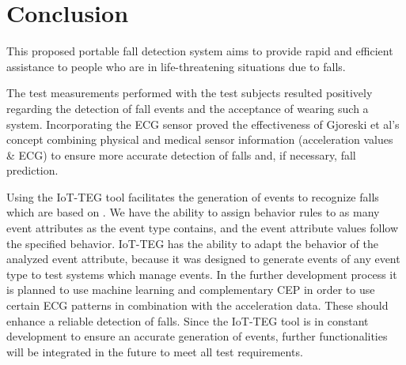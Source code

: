\documentclass[10pt,journal,compsoc]{IEEEtran}
\begin{document}
\section{Conclusion}
\label{sec:conclusion}
%

This proposed portable fall detection system aims to provide rapid and efficient assistance to people who are in life-threatening situations due to falls. 

The test measurements performed with the test subjects resulted positively regarding the detection of fall events and the acceptance of wearing such a system. Incorporating the ECG sensor proved the effectiveness of Gjoreski et al's concept \cite{Gjoreski2014} combining physical and medical sensor information (acceleration values \& ECG) to ensure more accurate detection of falls and, if necessary, fall prediction. 

Using the IoT-TEG tool \cite{Gutierrez2017,TesisGutierrez2017} facilitates the generation of events to recognize falls which are based on \cite{Kozina}. We have the ability to assign behavior rules to as many event attributes as the event type contains, and the event attribute values follow the specified behavior. IoT-TEG \cite{Gutierrez2017,TesisGutierrez2017} has the ability to adapt the behavior of the analyzed event attribute, because it was designed to generate events of any event type to test systems which manage events. In the further development process it is planned to use machine learning and complementary CEP in order to use certain ECG patterns in combination with the acceleration data. These should enhance a reliable detection of falls. Since the IoT-TEG tool \cite{Gutierrez2017,TesisGutierrez2017} is in constant development to ensure an accurate generation of events, further functionalities will be integrated in the future to meet all test requirements.
\end{document}
